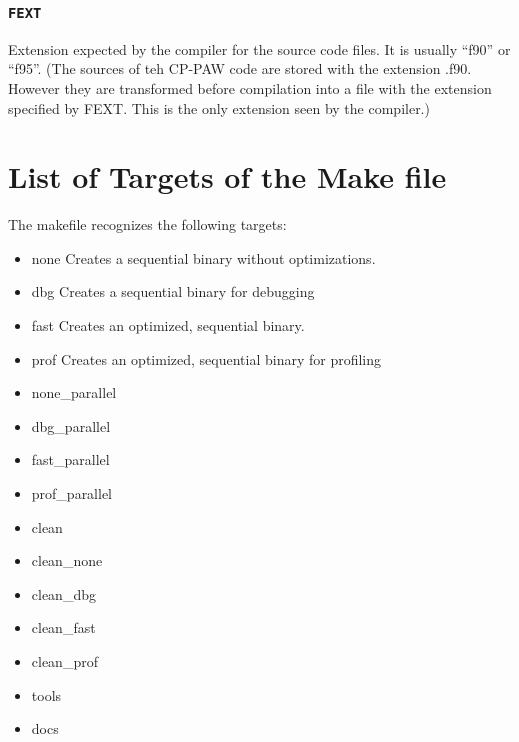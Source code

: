 \documentclass[a4paper,10pt]{report}
\newcommand{\mytt}[1]{{\tt #1}}
\begin{document}
\subsection{\mytt{FEXT}}
Extension expected by the compiler for the source code files. It is
usually ``f90'' or ``f95''. (The sources of teh CP-PAW code are stored with the 
extension .f90. However they are transformed before compilation into a file with 
the extension specified by FEXT. This is the only extension seen by the compiler.)


\chapter{List of Targets of the Make file}

The makefile recognizes the following targets:
\begin{itemize}
\item {none} Creates a sequential binary without optimizations. 
\item {dbg} Creates a sequential binary for debugging
\item {fast} Creates an optimized, sequential binary.
\item {prof} Creates an optimized, sequential binary for profiling
\item {none\_parallel}
\item {dbg\_parallel}
\item {fast\_parallel}
\item {prof\_parallel}
\item  {clean}
\item {clean\_none}
\item {clean\_dbg}
\item {clean\_fast}
\item {clean\_prof}
\item {tools}
\item {docs}
\end{itemize}
\end{document}

